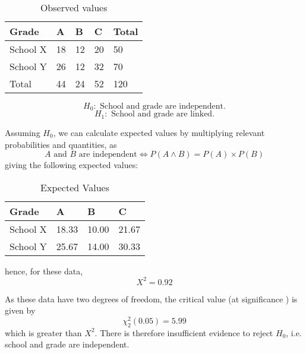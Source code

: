 \documentclass{article}
\begin{document}
\begin{table}[h]

    \centering

    \begin{tabular}{lllll}

        \toprule

        Grade       & A     & B     & C     & Total \\

        \midrule

        School X    & 18    & 12    & 20    & 50 \\
        School Y    & 26    & 12    & 32    & 70 \\
        Total       & 44    & 24    & 52    & 120 \\

        \bottomrule

    \end{tabular}

    \caption{Observed values}

\end{table}

\[H_0 : \textrm{ School and grade are independent.}\]
\[H_1 : \textrm{ School and grade are linked.}\]

Assuming $H_0$, we can calculate expected values by multiplying relevant
probabilities and quantities, as \[A \textrm{ and } B \textrm{ are independent}
\Leftrightarrow P(A \land B) = P(A) \times P(B)\] giving the following expected
values:

\begin{table}[h]

    \centering

    \begin{tabular}{llll}

        \toprule

        Grade       & A     & B     & C \\

        \midrule

        School X    & 18.33 & 10.00 & 21.67 \\
        School Y    & 25.67 & 14.00 & 30.33 \\

        \bottomrule

    \end{tabular}

    \caption{Expected Values}

\end{table}

hence, for these data, \[X^2 = 0.92\]

As these data have two degrees of freedom, the critical value (at significance
) is given by \[\chi^2_2\left(0.05\right) = 5.99\] which is
greater than $X^2$. There is therefore insufficient evidence to reject $H_0$,
i.e. school and grade are independent.
\end{document}
